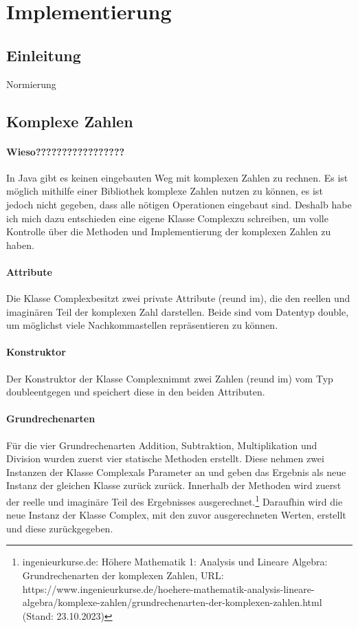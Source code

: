 \documentclass[12pt]{article}
\begin{document}
\section{Implementierung}
\subsection{Einleitung}
Normierung
\subsection{Komplexe Zahlen}
\paragraph{Wieso?????????????????}
In Java gibt es keinen eingebauten Weg mit komplexen Zahlen zu rechnen. Es ist möglich mithilfe einer Bibliothek komplexe Zahlen nutzen zu können, es ist jedoch nicht gegeben, dass alle nötigen Operationen eingebaut sind. Deshalb habe ich mich dazu entschieden eine eigene Klasse \glqq Complex\grqq zu schreiben, um volle Kontrolle über die Methoden und Implementierung der komplexen Zahlen zu haben.

\paragraph{Attribute}
Die Klasse \glqq Complex\grqq besitzt zwei private Attribute (\glqq re\grqq \space und \glqq im\grqq), die den reellen und imaginären Teil der komplexen Zahl darstellen. Beide sind vom Datentyp \glqq double\grqq, um möglichst viele Nachkommastellen repräsentieren zu können.

\paragraph{Konstruktor}
Der Konstruktor der Klasse \glqq Complex\grqq\space nimmt zwei Zahlen (\glqq re\grqq \space und \glqq im\grqq) vom Typ \glqq double\grqq\space entgegen und speichert diese in den beiden Attributen.

\paragraph{Grundrechenarten}
Für die vier Grundrechenarten Addition, Subtraktion, Multiplikation und Division wurden zuerst vier statische Methoden erstellt. Diese nehmen zwei Instanzen der Klasse \glqq Complex\grqq\space als Parameter an und geben das Ergebnis als neue Instanz der gleichen Klasse zurück zurück. Innerhalb der Methoden wird zuerst der reelle und imaginäre Teil des Ergebnisses ausgerechnet.\footnote{ingenieurkurse.de: Höhere Mathematik 1: Analysis und Lineare Algebra: Grundrechenarten der komplexen Zahlen, URL: https://www.ingenieurkurse.de/hoehere-mathematik-analysis-lineare-algebra/komplexe-zahlen/grundrechenarten-der-komplexen-zahlen.html (Stand: 23.10.2023)}
Daraufhin wird die neue Instanz der Klasse \glqq Complex\grqq, mit den zuvor ausgerechneten Werten, erstellt und diese zurückgegeben.
\end{document}
